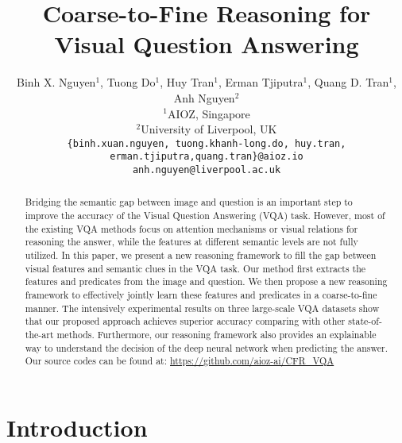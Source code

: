 \documentclass[10pt,twocolumn,letterpaper]{article}
\begin{document}
\title{Coarse-to-Fine Reasoning for Visual Question Answering}
\author{Binh X. Nguyen$^{1}$, Tuong Do$^{1}$, Huy Tran$^{1}$, Erman Tjiputra$^{1}$, Quang D. Tran$^{1}$, Anh Nguyen$^{2}$\\
{$^{1}$AIOZ, Singapore}\\
{$^{2}$University of Liverpool, UK}\\
{\tt\small \{binh.xuan.nguyen, tuong.khanh-long.do, huy.tran, erman.tjiputra,quang.tran\}@aioz.io}\\
{\tt\small anh.nguyen@liverpool.ac.uk}}

\maketitle

\begin{abstract}
Bridging the semantic gap between image and question is an important step to improve the accuracy of the Visual Question Answering (VQA) task. However, most of the existing VQA methods focus on attention mechanisms or visual relations for reasoning the answer, while the features at different semantic levels are not fully utilized. In this paper, we present a new reasoning framework to fill the gap between visual features and semantic clues in the VQA task. Our method first extracts the features and predicates from the image and question. We then propose a new reasoning framework to effectively jointly learn these features and predicates in a coarse-to-fine manner. The intensively experimental results on three large-scale VQA datasets show that our proposed approach achieves superior accuracy comparing with other state-of-the-art methods. Furthermore, our reasoning framework also provides an explainable way to understand the decision of the deep neural network when predicting the answer. Our source codes can be found at: \url{https://github.com/aioz-ai/CFR_VQA}



\end{abstract}

\section{Introduction}
\label{sec:intro}
\end{document}

